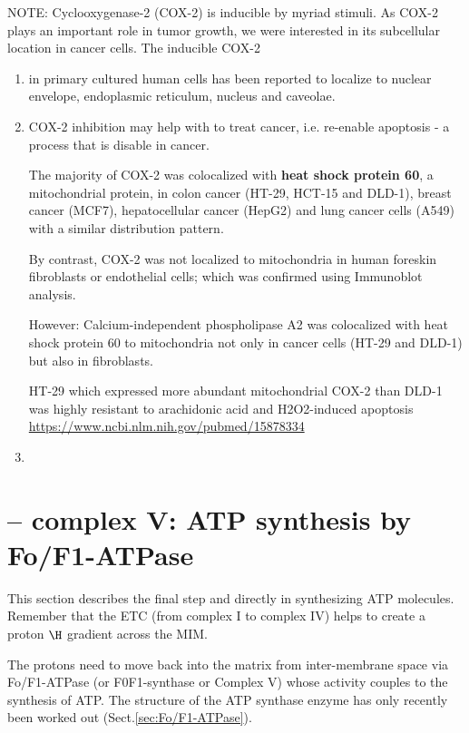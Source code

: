 NOTE: Cyclooxygenase-2 (COX-2) is inducible by myriad stimuli. As COX-2 plays an
important role in tumor growth, we were interested in its subcellular location
in cancer cells. The inducible COX-2
\begin{enumerate}
  \item in primary cultured human cells has been reported to
  localize to nuclear envelope, endoplasmic reticulum, nucleus and caveolae.
  
  \item COX-2 inhibition may help with to treat cancer, i.e. re-enable apoptosis
  - a process that is disable in cancer. 
  
  The majority of COX-2 was colocalized with {\bf heat shock protein 60}, a
  mitochondrial protein, in colon cancer (HT-29, HCT-15 and DLD-1), breast
  cancer (MCF7), hepatocellular cancer (HepG2) and lung cancer cells (A549) with
  a similar distribution pattern.
  
  By contrast, COX-2 was not localized to mitochondria in human foreskin
  fibroblasts or endothelial cells; which was confirmed using Immunoblot
  analysis.
  
  However:  Calcium-independent phospholipase A2 was colocalized with heat shock
  protein 60 to mitochondria not only in cancer cells (HT-29 and DLD-1) but also
  in fibroblasts.  
  
HT-29 which expressed more abundant mitochondrial COX-2 than DLD-1 was highly
resistant to arachidonic acid and H2O2-induced apoptosis
\url{https://www.ncbi.nlm.nih.gov/pubmed/15878334}
  \item 
  
\end{enumerate}

\section{-- complex V: ATP synthesis by Fo/F1-ATPase}
\label{sec:complex-V-mito}
\label{sec:ATP-synthesis}

This section describes the final step and directly in synthesizing ATP
molecules. Remember that the ETC (from complex I to complex IV) helps to create
a proton $\H$ gradient across the MIM. 

The protons need to move back into the matrix from inter-membrane space via
Fo/F1-ATPase (or F0F1-synthase or Complex V) whose activity couples to the
synthesis of ATP. The structure of the ATP synthase enzyme has only recently
been worked out (Sect.\ref{sec:Fo/F1-ATPase}).

